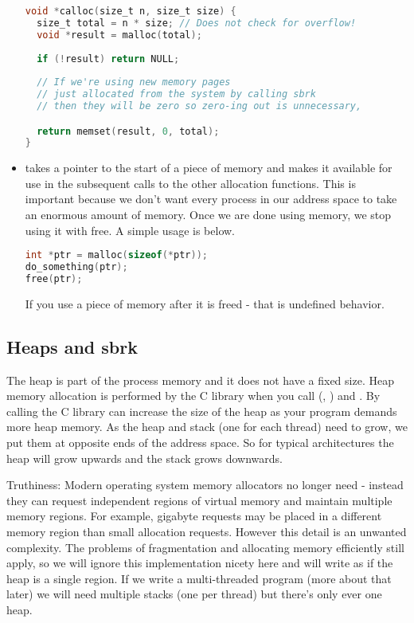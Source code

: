\begin{itemize}
\begin{lstlisting}[language=C]
void *calloc(size_t n, size_t size) {
  size_t total = n * size; // Does not check for overflow!
  void *result = malloc(total);
  
  if (!result) return NULL;
    
  // If we're using new memory pages 
  // just allocated from the system by calling sbrk
  // then they will be zero so zero-ing out is unnecessary,

  return memset(result, 0, total);
}
\end{lstlisting}

\item {} takes a pointer to the start of a piece of memory and makes it available for use in the subsequent calls to the other allocation functions.
This is important because we don't want every process in our address space to take an enormous amount of memory.
Once we are done using memory, we stop using it with free.
A simple usage is below.

\begin{lstlisting}[language=C]
int *ptr = malloc(sizeof(*ptr));
do_something(ptr);
free(ptr);
\end{lstlisting}

If you use a piece of memory after it is freed - that is undefined behavior.

\end{itemize}

\subsection{Heaps and sbrk}

The heap is part of the process memory and it does not have a fixed size.
Heap memory allocation is performed by the C library when you call  (, ) and .
By calling  the C library can increase the size of the heap as your program demands more heap memory.
As the heap and stack (one for each thread) need to grow, we put them at opposite ends of the address space.
So for typical architectures the heap will grow upwards and the stack grows downwards. 

Truthiness: Modern operating system memory allocators no longer need  - instead they can request independent regions of virtual memory and maintain multiple memory regions.
For example, gigabyte requests may be placed in a different memory region than small allocation requests.
However this detail is an unwanted complexity.
The problems of fragmentation and allocating memory efficiently still apply, so we will ignore this implementation nicety here and will write as if the heap is a single region.
If we write a multi-threaded program (more about that later) we will need multiple stacks (one per thread) but there's only ever one heap.

